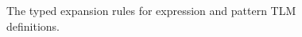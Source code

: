 \documentclass[acmsmall,screen]{acmart}
\begin{document}
\begin{figure}
{\small\begin{mathpar}
\end{mathpar}}
{\small\begin{mathpar}
\end{mathpar}}
\caption{The typed expansion rules for expression and pattern TLM definitions.}
\label{fig:ee-def-setlm}
\vspace{-5px}
\end{figure}





\end{document}
